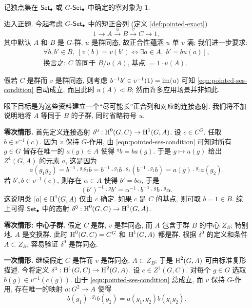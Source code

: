 \begin{convention}
	记独点集在 $\mathsf{Set}_\bullet$ 或 $G\text{-}\mathsf{Set}_\bullet$ 中确定的零对象为 $1$.
\end{convention}

进入正题. 今起考虑 $G\text{-}\mathsf{Set}_\bullet$ 中的短正合列 (定义 \ref{def:pointed-exact})
\[ 1 \to A \xrightarrow{u} B \xrightarrow{v} C \to 1, \]
其中默认 $A$ 和 $B$ 是 $G$-群, $u$ 是群同态, 故正合性蕴涵 $u$ 单 $v$ 满; 我们进一步要求:
\begin{equation}\label{eqn:pointed-ses-condition}
	\begin{gathered}
		\forall b, b' \in B, \; \left[ v(b) = v(b') \iff \exists a \in A, \; b' = b u(a) \right], \\
		\text{换言之: $C$ 等同于 $B/u(A)$, 基点 $= 1 \cdot u(A)$.}
	\end{gathered}
\end{equation}

假若 $C$ 是群而 $v$ 是群同态, 则考虑 $b^{-1} b' \in v^{-1}(1) = \operatorname{im}(u)$ 可知 \eqref{eqn:pointed-ses-condition} 自动成立, 而且此时 $u(A) \lhd B$; 然而许多应用场景并非如此.

眼下目标是为这些资料建立一个``尽可能长''正合列和对应的连接态射. 我们将不加说明地将 $A$ 等同于 $B$ 的子群, 同时省略符号 $u$.

\textbf{零次情形.}\;
首先定义连接态射 $\delta^0: \operatorname{H}^0(G, C) \to \operatorname{H}^1(G, A)$. 设 $c \in C^G$. 任取 $b \in v^{-1}(c)$. 因为 $v$ 保持 $G$-作用, 由 \eqref{eqn:pointed-ses-condition} 可知对所有 $g \in G$ 皆存在唯一的 $a(g) \in A$ 使得 ${}^g b = ba(g)$. 于是 $g \mapsto a(g)$ 给出 $Z^1(G, A)$ 的元素 $a$, 这是因为
\[ a(g_1 g_2) = b^{-1} \cdot {}^{g_1 g_2} b = b^{-1} \cdot {}^{g_1} b \cdot {}^{g_1} (b^{-1} \cdot {}^{g_2} b) = a(g) \cdot {}^{g_1} a(g_2). \]
若 $b', b \in v^{-1}(c)$, 则存在 $\alpha \in A$ 使得 $b' = b\alpha$, 于是
\[ (b')^{-1} \cdot {}^g b' = \alpha^{-1} \cdot b^{-1} \cdot {}^g b \cdot {}^g \alpha. \]
这说明类 $[a] \in \operatorname{H}^1(G, A)$ 仅由 $c$ 确定. 如果 $c$ 是 $C$ 的基点, 则可取 $b = 1 \in B$. 综上可得 $\mathsf{Set}_\bullet$ 中的态射 $\delta^0: \operatorname{H}^0(G, C) \to \operatorname{H}^1(G, A)$.

\textbf{零次情形: 中心子群.}\;
假定 $C$ 是群, $v$ 是群同态, 而 $A$ 包含于群 $B$ 的中心 $Z_B$; 特别地, $A$ 是交换群. 此时 $\operatorname{H}^0(G, C) = C^G$ 和 $\operatorname{H}^1(G, A)$ 都是群. 根据 $\delta^0$ 的定义和条件 $A \subset Z_B$, 容易验证 $\delta^0$ 是群同态.

\textbf{一次情形.}\;
继续假定 $C$ 是群而 $v$ 是群同态, $A \subset Z_B$; 于是 $\operatorname{H}^2(G, A)$ 可由标准复形描述. 今将定义 $\delta^1: \operatorname{H}^1(G, C) \to \operatorname{H}^2(G, A)$. 设 $c \in Z^1(G, C)$. 对每个 $g \in G$ 选取 $b(g) \in v^{-1}(c(g))$. 由于 \eqref{eqn:pointed-ses-condition} 总成立, 而 $v$ 保持 $G$-作用, 存在唯一的映射 $a: G^2 \to A$ 使得
\[ b(g_1) \cdot {}^{g_1} b(g_2) = a(g_1, g_2) b(g_1 g_2). \]

